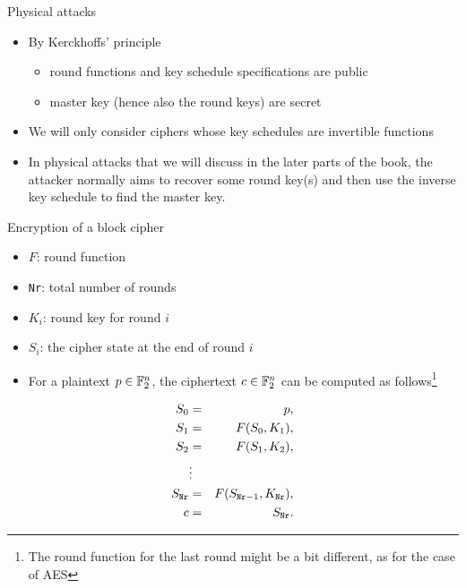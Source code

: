 \begin{frame}{Physical attacks}
    \begin{itemize}
        \item By Kerckhoffs' principle
        \begin{itemize}
            \item round functions and key schedule specifications are public
            \item master key (hence also the round keys) are secret
        \end{itemize}
        \item We will only consider ciphers whose key schedules are invertible functions
        \item In physical attacks that we will discuss in the later parts of the book, the attacker normally aims to recover some round key(s) and then use the inverse key schedule to find the master key.
    \end{itemize}
\end{frame}

\begin{frame}{Encryption of a block cipher}
    \begin{itemize}
        \item $F$: round function  
        \item \texttt{Nr}: total number of rounds
        \item $K_i$: round key for round $i$
        \item $S_i$: the cipher state at the end of round $i$
        \item For a plaintext $p\in{\mathbb F}_2^n$, the ciphertext $c\in{\mathbb F}_2^n$ can be computed as follows\footnote{The round function for the last round might be a bit different, as for the case of AES}
    \end{itemize}
    \begin{eqnarray*}
    S_0 &=& p,\\
    S_1 &=& F(S_0,K_1),\\
    S_2 &=& F(S_1,K_2),\\
    &\vdots&\\
    S_{\texttt{Nr}} &=& F(S_{\texttt{Nr}-1},K_{\texttt{Nr}}),\\
    c &=& S_{\texttt{Nr}}.
    \vspace*{-0.5cm}
\end{eqnarray*}
\end{frame}

